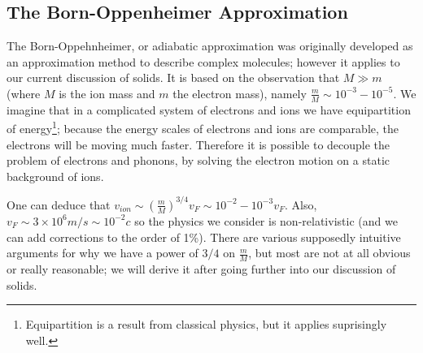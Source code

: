 \subsection{The Born-Oppenheimer Approximation}
The Born-Oppehnheimer, or adiabatic approximation was originally developed as an approximation method to describe complex molecules; however it applies to our current discussion of solids. It is based on the observation that $M \gg m$ (where $M$ is the ion mass and $m$ the electron mass), namely $\frac{m}{M} \sim 10^{-3}-10^{-5}$. We imagine that in a complicated system of electrons and ions we have equipartition of energy\footnote{Equipartition is a result from classical physics, but it applies suprisingly well.}; because the energy scales of electrons and ions are comparable, the electrons will be moving much faster. Therefore it is possible to decouple the problem of electrons and phonons, by solving the electron motion on a static background of ions. 

One can deduce that $v_{ion} \sim \left(\frac{m}{M}\right)^{3/4}v_F \sim 10^{-2}-10^{-3}v_F$. Also, $v_F \sim 3 \times 10^{6}\si{m/s} \sim 10^{-2}c$ so the physics we consider is non-relativistic (and we can add corrections to the order of 1\%). There are various supposedly intuitive arguments for why we have a power of $3/4$ on $\frac{m}{M}$, but most are not at all obvious or really reasonable; we will derive it after going further into our discussion of solids.

